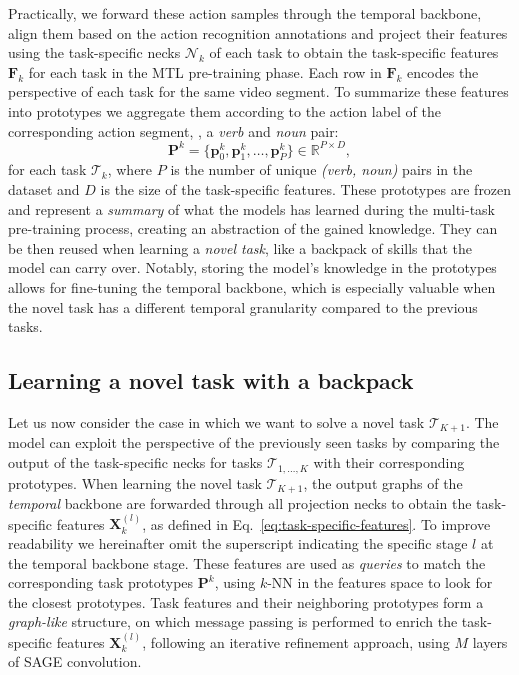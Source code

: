 Practically, we forward these action samples through the temporal backbone, align them based on the action recognition annotations and project their features using the task-specific necks $\mathcal{N}_k$ of each task to obtain the task-specific features $\mathbf{F}_k$ for each task in the MTL pre-training phase. Each row in $\mathbf{F}_k$ encodes the perspective of each task for the same video segment.
%
To summarize these features into prototypes we aggregate them according to the action label of the corresponding action segment, \ie, a \textit{verb} and \textit{noun} pair:
\begin{equation}
    \mathbf{P}^k = \{ \mathbf{p}^{k}_{0}, \mathbf{p}^{k}_{1}, \dots, \mathbf{p}^{k}_{P
    } \} \in \mathbb{R}^{P \times D},
\end{equation}
for each task $\mathcal{T}_k$, where $P$ is the number of unique \textit{(verb, noun)} pairs in the dataset and $D$ is the size of the task-specific features.
These prototypes are frozen and represent a \emph{summary} of what the models has learned during the multi-task pre-training process, creating an abstraction of the gained knowledge. They can be then reused when learning a \emph{novel task}, like a backpack of skills that the model can carry over.
Notably, storing the model's knowledge in the prototypes allows for fine-tuning the temporal backbone, which is especially valuable when the novel task has a different temporal granularity compared to the previous tasks.

\subsection{Learning a novel task with a backpack}\label{sec:method_egopack_learning}
Let us now consider the case in which we want to solve a novel task $\mathcal{T}_{K+1}$.
The model can exploit the perspective of the previously seen tasks by comparing the output of the task-specific necks for tasks $\mathcal{T}_{1,\dots,K}$ with their corresponding prototypes.
When learning the novel task $\mathcal{T}_{K+1}$, the output graphs of the \emph{temporal} backbone are forwarded through all projection necks to obtain the task-specific features $\mathbf{X}^{(l)}_{k}$, as defined in Eq.~\ref{eq:task-specific-features}.
To improve readability we hereinafter omit the superscript indicating the specific stage $l$ at the temporal backbone stage.
These features are used as \emph{queries} to match the corresponding task prototypes $\mathbf{P}^k$, using $k$-NN in the features space to look for the closest prototypes.
Task features and their neighboring prototypes form a \emph{graph-like} structure, on which message passing is performed to enrich the task-specific features $\mathbf{X}^{(l)}_k$, following an iterative refinement approach, using $M$ layers of SAGE convolution.
%

